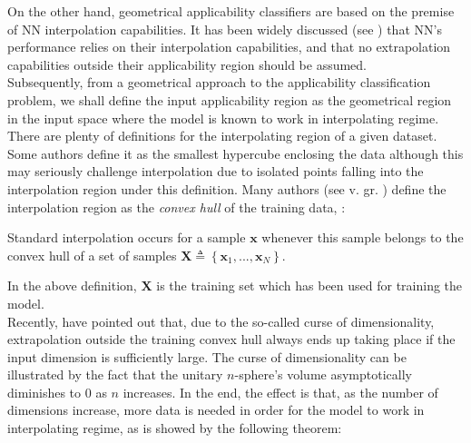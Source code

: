 On the other hand, geometrical applicability classifiers are based on the premise of NN interpolation capabilities. It has been widely discussed (see \eg \cite{pmlr-v80-barrett18a,DBLP:journals/corr/abs-1711-00350,DBLP:journals/corr/abs-1904-01557}) that NN's performance relies on their interpolation capabilities, and that no extrapolation capabilities outside their applicability region should be assumed.\\
%
\indent Subsequently, from a geometrical approach to the applicability classification problem, we shall define the input applicability region as the geometrical region in the input space where the model is known to work in interpolating regime.\\
%
\indent There are plenty of definitions for the interpolating region of a given dataset. Some authors define it as the smallest hypercube enclosing the data\cite{ebert2014interpolation} although this may seriously challenge interpolation due to isolated points falling into the interpolation region under this definition. Many authors (see v. gr. \cite{loh2007extrapolation,4505337}) define the interpolation region as the \textit{convex hull} of the training data, \ie:

\begin{definition}\cite{balestriero2021learning}\label{def:interpolacion}
	Standard interpolation occurs for a sample $\mathbf{x}$ whenever this sample belongs to the convex hull of a set of samples $\mathbf{X}\triangleq \left\{\mathbf{x}_1,...,\mathbf{x}_N\right\}$.
\end{definition}

In the above definition, $\mathbf{X}$ is the training set which has been used for training the model.\\
%
\indent Recently, \cite{balestriero2021learning} have pointed out that, due to the so-called curse of dimensionality, extrapolation outside the training convex hull always ends up taking place if the input dimension is sufficiently large. The curse of dimensionality\cite[pp. 17-18]{Marsland2015Machine} can be illustrated by the fact that the unitary $n$-sphere's volume asymptotically diminishes to $0$ as $n$ increases. In the end, the effect is that, as the number of dimensions increase, more data is needed in order for the model to work in interpolating regime, as is showed by the following theorem:\\

